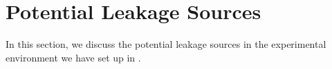 \chapter{Potential Leakage Sources}

In this section, we discuss the potential leakage sources in the experimental environment we have set up in . 

%
%
%
%
